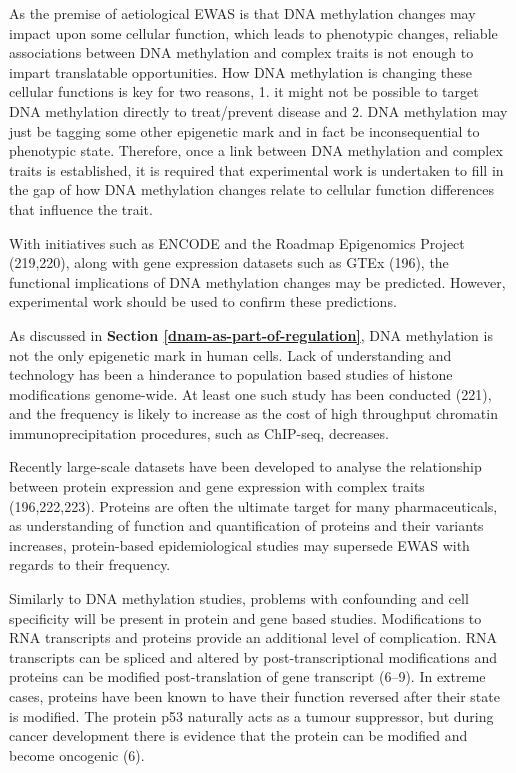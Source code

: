 \documentclass[11pt,oneside]{bristolthesis}
\begin{document}
As the premise of aetiological EWAS is that DNA methylation changes may impact upon some cellular function, which leads to phenotypic changes, reliable associations between DNA methylation and complex traits is not enough to impart translatable opportunities. How DNA methylation is changing these cellular functions is key for two reasons, 1. it might not be possible to target DNA methylation directly to treat/prevent disease and 2. DNA methylation may just be tagging some other epigenetic mark and in fact be inconsequential to phenotypic state. Therefore, once a link between DNA methylation and complex traits is established, it is required that experimental work is undertaken to fill in the gap of how DNA methylation changes relate to cellular function differences that influence the trait.

With initiatives such as ENCODE and the Roadmap Epigenomics Project (219,220), along with gene expression datasets such as GTEx (196), the functional implications of DNA methylation changes may be predicted. However, experimental work should be used to confirm these predictions.

As discussed in \textbf{Section \ref{dnam-as-part-of-regulation}}, DNA methylation is not the only epigenetic mark in human cells. Lack of understanding and technology has been a hinderance to population based studies of histone modifications genome-wide. At least one such study has been conducted (221), and the frequency is likely to increase as the cost of high throughput chromatin immunoprecipitation procedures, such as ChIP-seq, decreases.

Recently large-scale datasets have been developed to analyse the relationship between protein expression and gene expression with complex traits (196,222,223). Proteins are often the ultimate target for many pharmaceuticals, as understanding of function and quantification of proteins and their variants increases, protein-based epidemiological studies may supersede EWAS with regards to their frequency.

Similarly to DNA methylation studies, problems with confounding and cell specificity will be present in protein and gene based studies. Modifications to RNA transcripts and proteins provide an additional level of complication. RNA transcripts can be spliced and altered by post-transcriptional modifications and proteins can be modified post-translation of gene transcript (6--9). In extreme cases, proteins have been known to have their function reversed after their state is modified. The protein p53 naturally acts as a tumour suppressor, but during cancer development there is evidence that the protein can be modified and become oncogenic (6).
\end{document}
